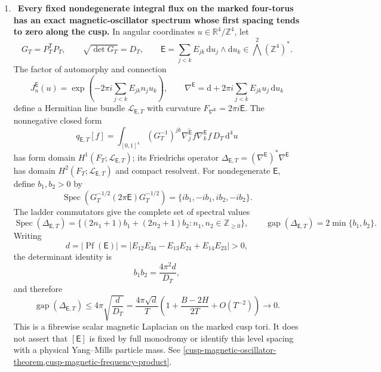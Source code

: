\begin{enumerate}[leftmargin=1.8em,itemsep=.65em]
\item \Verified\ \textbf{Every fixed nondegenerate integral flux on the
marked four-torus has an exact magnetic-oscillator spectrum whose first
spacing tends to zero along the cusp.}
In angular coordinates \(u\in\mathbb R^4/\mathbb Z^4\), let
\[
 G_T=P_T^{\mathsf T}P_T,
 \qquad \sqrt{\det G_T}=D_T,
 \qquad
 \mathsf E=\sum_{j<k}E_{jk}\,\mathrm du_j\wedge\mathrm du_k
 \in\bigwedge^2(\mathbb Z^4)^*.
\]
The factor of automorphy and connection
\[
 J_n^{\mathsf E}(u)
 =\exp\!\left(-2\pi i\sum_{j<k}E_{jk}n_ju_k\right),
 \qquad
 \nabla^{\mathsf E}
 =\mathrm d+2\pi i\sum_{j<k}E_{jk}u_j\,\mathrm du_k
\]
define a Hermitian line bundle \(\mathscr L_{\mathsf E,T}\) with curvature
\(F_{\nabla^{\mathsf E}}=2\pi i\mathsf E\).  The nonnegative closed form
\[
 q_{\mathsf E,T}[f]=\int_{[0,1]^4}
 (G_T^{-1})^{jk}\overline{\nabla_j^{\mathsf E}f}
 \nabla_k^{\mathsf E}f\,D_T\,\mathrm d^4u
\]
has form domain \(H^1(F_T;\mathscr L_{\mathsf E,T})\); its Friedrichs
operator \(\Delta_{\mathsf E,T}=(\nabla^{\mathsf E})^*\nabla^{\mathsf E}\)
has domain \(H^2(F_T;\mathscr L_{\mathsf E,T})\) and compact resolvent.
For nondegenerate \(\mathsf E\), define \(b_1,b_2>0\) by
\[
 \operatorname{Spec}\!\left(
 G_T^{-1/2}(2\pi\mathsf E)G_T^{-1/2}\right)
 =\{ib_1,-ib_1,ib_2,-ib_2\}.
\]
The ladder commutators give the complete set of spectral values
\[
 \operatorname{Spec}(\Delta_{\mathsf E,T})
 =\{(2n_1+1)b_1+(2n_2+1)b_2:
 n_1,n_2\in\mathbb Z_{\ge0}\},
 \qquad
 \operatorname{gap}(\Delta_{\mathsf E,T})=2\min\{b_1,b_2\}.
\]
Writing
\[
 d=|\operatorname{Pf}(\mathsf E)|
 =|E_{12}E_{34}-E_{13}E_{24}+E_{14}E_{23}|>0,
\]
the determinant identity is
\[
 b_1b_2=\frac{4\pi^2d}{D_T},
\]
and therefore
\[
 \operatorname{gap}(\Delta_{\mathsf E,T})
 \le4\pi\sqrt{\frac d{D_T}}
 =\frac{4\pi\sqrt d}{T}
 \left(1+\frac{B-2H}{2T}+O(T^{-2})\right)\longrightarrow0.
\]
This is a fibrewise scalar magnetic Laplacian on the marked cusp tori.  It
does not assert that \([\mathsf E]\) is fixed by full monodromy or identify
this level spacing with a physical Yang--Mills particle mass.  See
\cref{cusp-magnetic-oscillator-theorem,cusp-magnetic-frequency-product}.


\end{enumerate}
